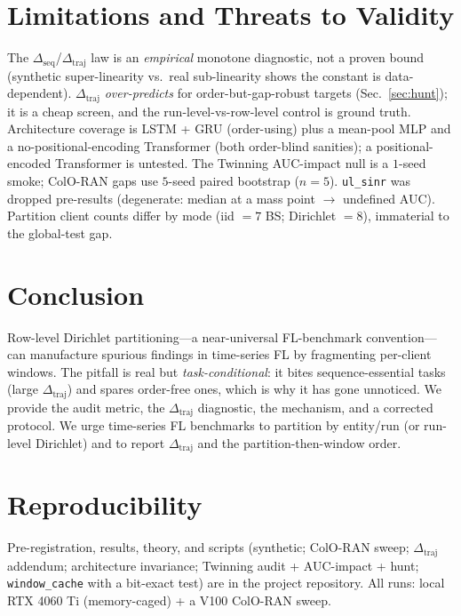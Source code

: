 \documentclass[conference]{IEEEtran}
\newcommand{\dseq}{\Delta_{\mathrm{seq}}}
\newcommand{\dtraj}{\Delta_{\mathrm{traj}}}
\newcommand{\code}[1]{\texttt{#1}}
\begin{document}
\section{Limitations and Threats to Validity}
The $\dseq$/$\dtraj$ law is an \emph{empirical} monotone diagnostic, not a proven bound (synthetic
super-linearity vs.\ real sub-linearity shows the constant is data-dependent). $\dtraj$ \emph{over-predicts}
for order-but-gap-robust targets (Sec.~\ref{sec:hunt}); it is a cheap screen, and the
run-level-vs-row-level control is ground truth. Architecture coverage is LSTM + GRU (order-using) plus a
mean-pool MLP and a no-positional-encoding Transformer (both order-blind sanities); a positional-encoded
Transformer is untested. The Twinning AUC-impact null is a $1$-seed smoke; ColO-RAN gaps use $5$-seed
paired bootstrap ($n{=}5$). \code{ul\_sinr} was dropped pre-results (degenerate: median at a mass point
$\rightarrow$ undefined AUC). Partition client counts differ by mode (iid $=7$ BS; Dirichlet $=8$),
immaterial to the global-test gap.

\section{Conclusion}
Row-level Dirichlet partitioning---a near-universal FL-benchmark convention---can manufacture spurious
findings in time-series FL by fragmenting per-client windows. The pitfall is real but
\emph{task-conditional}: it bites sequence-essential tasks (large $\dtraj$) and spares order-free ones,
which is why it has gone unnoticed. We provide the audit metric, the $\dtraj$ diagnostic, the mechanism,
and a corrected protocol. We urge time-series FL benchmarks to partition by entity/run (or run-level
Dirichlet) and to report $\dtraj$ and the partition-then-window order.

\section*{Reproducibility}
Pre-registration, results, theory, and scripts (synthetic; ColO-RAN sweep; $\dtraj$ addendum;
architecture invariance; Twinning audit + AUC-impact + hunt; \code{window\_cache} with a bit-exact test)
are in the project repository. All runs: local RTX 4060 Ti (memory-caged) + a V100 ColO-RAN sweep.



\end{document}

